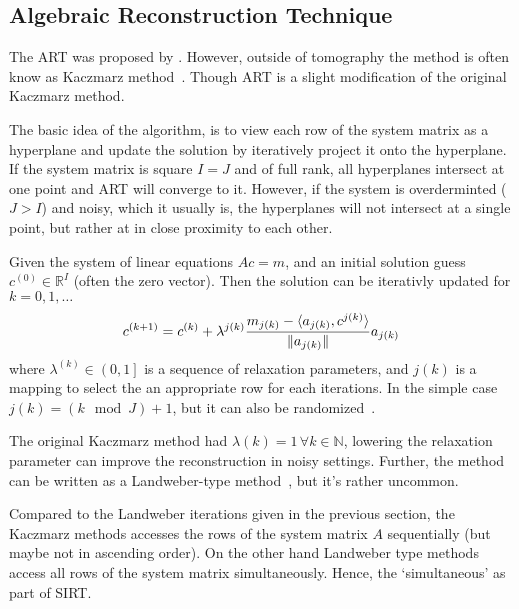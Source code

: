 \subsection{Algebraic Reconstruction Technique}\label{subsec:algebraic_reconstruction_technique}

The \gls{ART} was proposed by \citeauthor{gordon_algebraic_1970}\cite{gordon_algebraic_1970}.
However, outside of tomography the method is often know as Kaczmarz
method~\cite{kaczmarz_approximate_1993}. Though \gls{ART} is a slight modification of the original
Kaczmarz method.

The basic idea of the algorithm, is to view each row of the system matrix as a hyperplane and update
the solution by iteratively project it onto the hyperplane. If the system matrix is square \(I = J\)
and of full rank, all hyperplanes intersect at one point and \gls{ART} will converge to it. However, if
the system is overderminted (\(J > I\)) and noisy, which it usually is, the hyperplanes will not
intersect at a single point, but rather at in close proximity to each other.

\begin{definition}\label{def:art}
	Given the system of linear equations \(Ac = m\), and an initial solution guess \(c^{(0)} \in
	\mathbb{R}^I\) (often the zero vector). Then the solution can be iterativly updated for
	\(k = 0, 1, \dots\)
	\[
		c^{(k+1)} = c^{(k)} + \lambda^{j(k)} \frac{m_{j(k)} - \langle a_{j(k)}, c^{j(k)} \rangle}{\lVert a_{j(k)}\rVert}a_{j(k)}
	\]
	where \(\lambda^{(k)} \in \left(0, 1\right]\) is a sequence of relaxation parameters, and
	\(j(k)\) is a mapping to select the an appropriate row for each iterations. In the simple
	case \(j(k) = (k \mod J) + 1\), but it can also be
	randomized~\cite{strohmer_randomized_2007}.
\end{definition}

The original Kaczmarz method had \(\lambda(k) = 1\, \forall k \in \mathbb{N}\), lowering the
relaxation parameter can improve the reconstruction in noisy settings. Further, the method can be
written as a Landweber-type method~\cite{hansen_discrete_2010}, but it's rather uncommon.

Compared to the Landweber iterations given in the previous section, the Kaczmarz methods accesses
the rows of the system matrix \(A\) sequentially (but maybe not in ascending order). On the other
hand Landweber type methods access all rows of the system matrix simultaneously. Hence, the
`simultaneous' as part of \gls{SIRT}\@.

